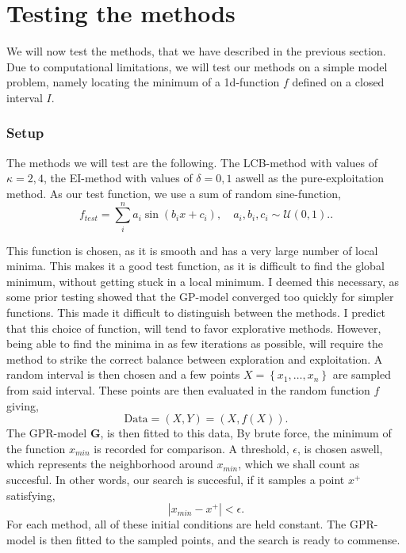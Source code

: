 \documentclass[working, oneside]{../../../Preambles/marginclass}
\begin{document}
\chapter{Testing the methods}

We will now test the methods, that we have described in the previous section. Due to computational limitations, we will test our methods on a simple model problem, namely locating the minimum of a 1d-function $f$ defined on a closed interval $I$. 
\subsection{Setup}
The methods we will test are the following. The LCB-method with values of $\kappa = 2, 4$, the EI-method with values of $\delta = 0, 1$ aswell as the pure-exploitation method. As our test function, we use a sum of random sine-function,
\[
f_{test} = \sum_i^{n} a_i \sin(b_i x + c_i), \quad a_i, b_i, c_i \sim \mathcal{U}(0, 1).
.\] 

This function is chosen, as it is smooth and has a very large number of local minima. This makes it a good test function, as it is difficult to find the global minimum, without getting stuck in a local minimum. I deemed this necessary, as some prior testing showed that the GP-model converged too quickly for simpler functions. This made it difficult to distinguish between the methods. I predict that this choice of function, will tend to favor explorative methods. However, being able to find the minima in as few iterations as possible, will require the method to strike the correct balance between exploration and exploitation.
A random interval is then chosen and a few points $X = \left\{   x_1, \ldots, x_{n}\right\}$ are sampled from said interval. These points are then evaluated in the random function $f$ giving,
\[
\text{Data} = \left( X, Y \right) = \left( X, f\left( X \right)  \right) 
.\] 
The GPR-model $\bm{G}$, is then fitted to this data, 
By brute force, the minimum of the function $x_{min}$ is recorded for comparison. A threshold, $\epsilon$, is chosen aswell, which represents the neighborhood around $x_{min}$, which we shall count as succesful. In other words, our search is succesful, if it samples a point $x^{+}$ satisfying,
\[
\left| x_{min} - x^{+} \right| < \epsilon
.\]
For each method, all of these initial conditions are held constant. The GPR-model is then fitted to the sampled points, and the search is ready to commense.
\end{document}
